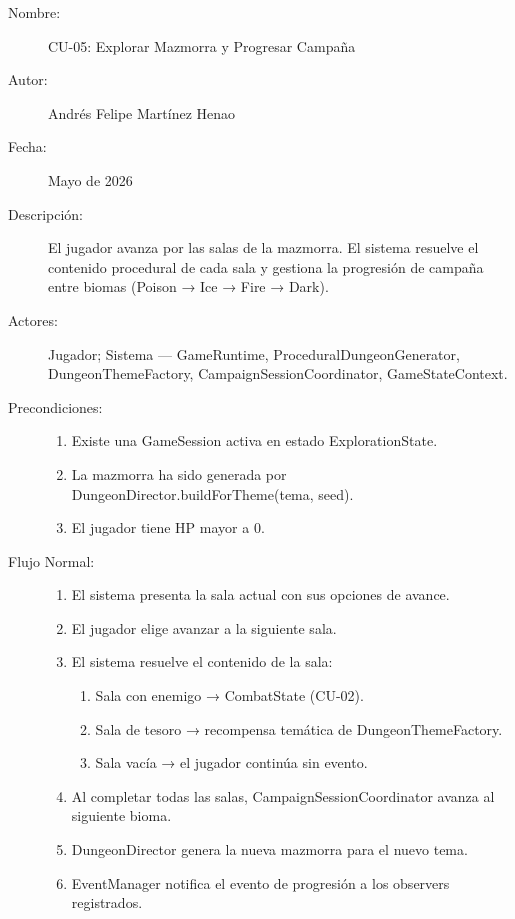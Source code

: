 \documentclass[stu,12pt,floatsintext]{apa7}
\begin{document}
\begin{description}
    \item[Nombre:] CU-05: Explorar Mazmorra y Progresar Campaña
    \item[Autor:] Andrés Felipe Martínez Henao
    \item[Fecha:] Mayo de 2026
    \item[Descripción:] El jugador avanza por las salas de la mazmorra. El sistema resuelve el contenido procedural de cada sala y gestiona la progresión de campaña entre biomas (Poison → Ice → Fire → Dark).
    \item[Actores:] Jugador; Sistema — GameRuntime, ProceduralDungeonGenerator, DungeonThemeFactory, CampaignSessionCoordinator, GameStateContext.
    \item[Precondiciones:] \hfill
        \begin{enumerate}[label=\arabic*.]
            \item Existe una GameSession activa en estado ExplorationState.
            \item La mazmorra ha sido generada por DungeonDirector.buildForTheme(tema, seed).
            \item El jugador tiene HP mayor a 0.
        \end{enumerate}
    \item[Flujo Normal:] \hfill
        \begin{enumerate}[label=\arabic*.]
            \item El sistema presenta la sala actual con sus opciones de avance.
            \item El jugador elige avanzar a la siguiente sala.
            \item El sistema resuelve el contenido de la sala:
                \begin{enumerate}[label=\alph*)]
                    \item Sala con enemigo → CombatState (CU-02).
                    \item Sala de tesoro → recompensa temática de DungeonThemeFactory.
                    \item Sala vacía → el jugador continúa sin evento.
                \end{enumerate}
            \item Al completar todas las salas, CampaignSessionCoordinator avanza al siguiente bioma.
            \item DungeonDirector genera la nueva mazmorra para el nuevo tema.
            \item EventManager notifica el evento de progresión a los observers registrados.

\end{enumerate}
\end{description}
\end{document}
